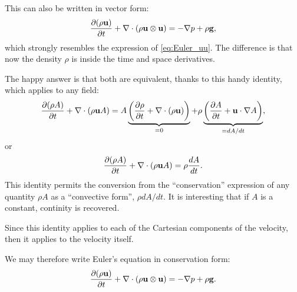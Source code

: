 This can
also be written in vector form:
\[
\frac{\partial  (\rho \mathbf{u} ) }{\partial t} +
\nabla \cdot ( \rho \mathbf{u} \otimes \mathbf{u} ) =
  - \nabla p 
  + \rho \mathbf{g} ,
\]
which strongly resembles the expression of \ref{eq:Euler_uu}. The
difference is that now the density $\rho$ is inside the time and
space derivatives.

The happy answer is that both are equivalent, thanks to this handy
identity, which applies to any field:
\[
\frac{\partial ( \rho  A ) }{\partial t} +
\nabla  \cdot ( \rho \bfu A) =
%
A
\underbrace{
\left(
\frac{\partial \rho }{\partial t} +
\nabla  \cdot ( \rho \bfu ) 
\right)}_{=0}  +
\rho 
\underbrace{
\left(
\frac{\partial A }{\partial t} +
\bfu \cdot \nabla  A
\right) }_{=dA/dt}  ,
\]
or
\begin{equation}
  \label{eq:conserv_to_total}
  \frac{\partial ( \rho  A ) }{\partial t} +
  \nabla  \cdot ( \rho \mathbf{u} A) =
  \rho \frac{d  A }{d t} .
\end{equation}
This identity permits the conversion from the ``conservation''
expression of any quantity $\rho A$ as a ``convective form'', $\rho
dA/dt$. It is interesting that if $A$ is a constant, continity is
recovered.

Since this identity applies to each of the Cartesian components of the
velocity, then it applies to the velocity itself.

We may therefore write Euler's equation in conservation form:
\[
\frac{\partial  (\rho \mathbf{u} ) }{\partial t} +
 \nabla \cdot ( \rho \mathbf{u} \otimes \mathbf{u} ) =
 - \nabla p 
 + \rho \mathbf{g} .
\]



